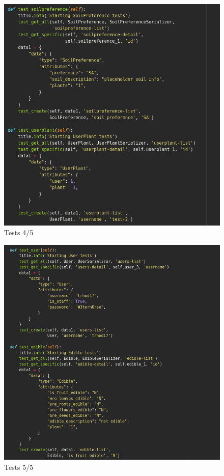 \documentclass{article}
\begin{document}
\begin{center}
       \begin{figure}[!htb]
           \centering
           \caption{Tests 4/5}
           \includegraphics[scale=0.50]{tests4}
       \end{figure}
       
       \begin{figure}[!htb]
           \centering
           \caption{Tests 5/5}
           \includegraphics[scale=0.50]{tests5}
       \end{figure}
       \end{center}
    
	
\end{document}
